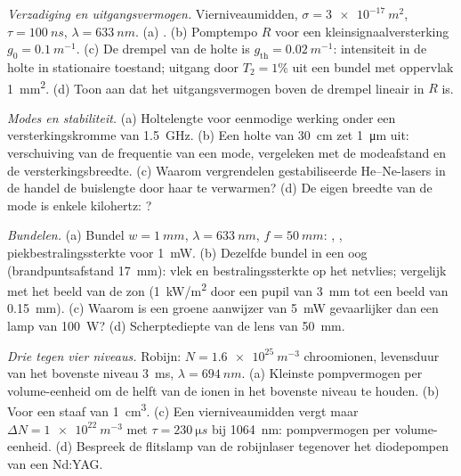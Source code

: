 \begin{exercise}[$\star\star$]\label{exo:b2:laser:6}
\emph{Verzadiging en uitgangsvermogen.} Vierniveaumidden,
$\sigma =
\qty{3e-17}{m^2}$, $\tau = \qty{100}{ns}$,
$\lambda = \qty{633}{nm}$.
(a) . (b) Pomptempo $R$ voor een kleinsignaalversterking
$g_0 = \qty{0.1}{m^{-1}}$. (c) De drempel van de holte is
$g_{\text{th}} = \qty{0.02}{m^{-1}}$: intensiteit in de holte in stationaire
toestand; uitgang door $T_2 = 1\%$ uit een bundel met oppervlak \qty{1}{mm^2}.
(d) Toon aan dat het uitgangsvermogen boven de drempel lineair in $R$ is.
\end{exercise}

\begin{exercise}[$\star\star$]\label{exo:b2:laser:7}
\emph{Modes en stabiliteit.} (a) Holtelengte voor eenmodige werking
onder een versterkingskromme van \qty{1.5}{GHz}. (b) Een holte van \qty{30}{cm} zet
\qty{1}{\micro m} uit: verschuiving van de frequentie van een mode,
vergeleken met de
modeafstand en de versterkingsbreedte. (c) Waarom vergrendelen
gestabiliseerde He--Ne-lasers
in de handel de buislengte door haar te verwarmen? (d) De eigen breedte van
de mode is
enkele kilohertz: ?
\end{exercise}

\begin{exercise}[$\star\star$]\label{exo:b2:laser:8}
\emph{Bundelen.} (a) Bundel $w = \qty{1}{mm}$, $\lambda = \qty{633}{nm}$,
$f = \qty{50}{mm}$: , , piekbestralingssterkte voor
\qty{1}{mW}. (b) Dezelfde bundel in een oog (brandpuntsafstand \qty{17}{mm}):
vlek en bestralingssterkte op het netvlies; vergelijk met het beeld van de zon
(\qty{1}{kW/m^2} door een pupil van \qty{3}{mm} tot een beeld van \qty{0.15}{mm}).
(c) Waarom is een groene aanwijzer van \qty{5}{mW} gevaarlijker dan een
lamp van \qty{100}{W}? (d) Scherptediepte van de lens van \qty{50}{mm}.
\end{exercise}

\begin{exercise}[$\star\star$]\label{exo:b2:laser:9}
\emph{Drie tegen vier niveaus.} Robijn: $N = \qty{1.6e25}{m^{-3}}$
chroomionen, levensduur van het bovenste niveau \qty{3}{ms},
$\lambda =
\qty{694}{nm}$. (a) Kleinste pompvermogen per volume-eenheid om
de helft van de
ionen in het bovenste niveau te houden. (b) Voor een staaf van
\qty{1}{cm^3}. (c) Een vierniveaumidden
vergt maar $\Delta N = \qty{1e22}{m^{-3}}$ met $\tau =
\qty{230}{\micro s}$
bij \qty{1064}{nm}: pompvermogen per volume-eenheid. (d) Bespreek
de flitslamp van de robijnlaser tegenover het diodepompen van een Nd:YAG.
\end{exercise}

